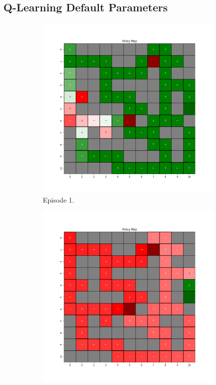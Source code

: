 \documentclass{assignment}
\begin{document}
\subsection{Q-Learning Default Parameters}
\begin{figure}[H]
    \begin{subfigure}{0.3\textwidth}
        \includegraphics[width=\textwidth]{figures/policy_q/default/policy_alpha_0.1_gamma_0.95_epsilon_0.2_iteration_1.png}
    \caption{Episode 1.}
    \end{subfigure}\hfill
    \begin{subfigure}{0.3\textwidth}
        \includegraphics[width=\textwidth]{figures/policy_q/default/policy_alpha_0.1_gamma_0.95_epsilon_0.2_iteration_50.png}

\end{subfigure}
\end{figure}
\end{document}
